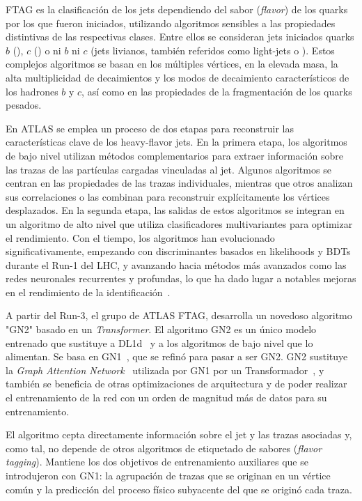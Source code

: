 \ac{FTAG} es la clasificación de los jets dependiendo del sabor (\textit{flavor}) de los quarks por los que fueron iniciados, utilizando algoritmos sensibles a las propiedades distintivas de las respectivas clases. Entre ellos se consideran jets iniciados quarks \(b\) (\bjets), \(c\) (\cjets) o ni \(b\) ni \(c\) (jets livianos, tambi\'en referidos como light-jets o \ljets).
Estos complejos algoritmos se basan en los múltiples vértices, en la elevada masa, la alta multiplicidad de decaimientos y los modos de decaimiento característicos de los hadrones \(b\) y \(c\), así como en las propiedades de la fragmentación de los quarks pesados.


En \ac{ATLAS} se emplea un proceso de dos etapas para reconstruir las características clave de los heavy-flavor jets. En la primera etapa, los algoritmos de bajo nivel utilizan métodos complementarios para extraer información sobre las trazas de las partículas cargadas vinculadas al jet. Algunos algoritmos se centran en las propiedades de las trazas individuales, mientras que otros analizan sus correlaciones o las combinan para reconstruir explícitamente los vértices desplazados. En la segunda etapa, las salidas de estos algoritmos se integran en un algoritmo de alto nivel que utiliza clasificadores multivariantes para optimizar el rendimiento. Con el tiempo, los algoritmos han evolucionado significativamente, empezando con discriminantes basados en likelihoods y \acp{BDT} durante el Run-1 del \ac{LHC}, y avanzando hacia métodos más avanzados como las redes neuronales recurrentes y profundas, lo que ha dado lugar a notables mejoras en el rendimiento de la identificación~\cite{ATLAS-FTAG-Calibration-2012,ATLAS-FTAG-Efficiency-2012,MV2Algorithm,ATLAS-FTAG-DeepLearning}.

A partir del Run-3, el grupo de \ac{ATLAS} \ac{FTAG}, desarrolla un novedoso algoritmo "GN2" basado en un \textit{Transformer}. El algoritmo GN2 es un único modelo entrenado que sustituye a DL1d~\cite{ATLAS-FTAG-DL1-Run2} y a los algoritmos de bajo nivel que lo alimentan. Se basa en GN1~\cite{ATLAS-FTAG-GN1}, que se refinó para pasar a ser GN2. GN2 sustituye la \textit{Graph Attention Network}~\cite{GANs} utilizada por GN1 por un Transformador~\cite{GN2Transformer}, y también se beneficia de otras optimizaciones de arquitectura y de poder realizar el entrenamiento de la red con un orden de magnitud más de datos para su entrenamiento.

El algoritmo cepta directamente información sobre el jet y las trazas asociadas y, como tal, no depende de otros algoritmos de etiquetado de sabores (\textit{flavor tagging}). Mantiene los dos objetivos de entrenamiento auxiliares que se introdujeron con GN1: la agrupación de trazas que se originan en un vértice común y la predicción del proceso físico subyacente del que se originó cada traza.

